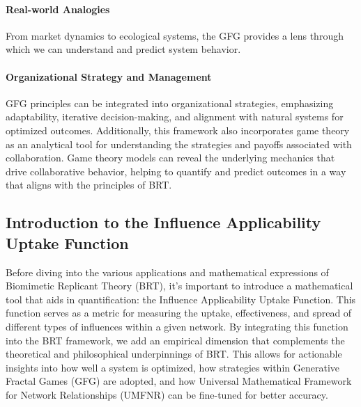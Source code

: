 \documentclass[sn-nature]{sn-jnl}%
\theoremstyle{thmstyleone}%
\theoremstyle{thmstyletwo}%
\theoremstyle{thmstylethree}%
\begin{document}
\paragraph{Real-world Analogies}
From market dynamics to ecological systems, the GFG provides a lens through which we can understand and predict system behavior.
\paragraph{Organizational Strategy and Management}
GFG principles can be integrated into organizational strategies, emphasizing adaptability, iterative decision-making, and alignment with natural systems for optimized outcomes\cite{ujwary-gil_organizational_2020}. Additionally, this framework also incorporates game theory as an analytical tool for understanding the strategies and payoffs associated with collaboration. Game theory models can reveal the underlying mechanics that drive collaborative behavior, helping to quantify and predict outcomes in a way that aligns with the principles of BRT.


\subsection{Introduction to the Influence Applicability Uptake Function}

Before diving into the various applications and mathematical expressions of Biomimetic Replicant Theory (BRT), it's important to introduce a mathematical tool that aids in quantification: the Influence Applicability Uptake Function. This function serves as a metric for measuring the uptake, effectiveness, and spread of different types of influences within a given network.
By integrating this function into the BRT framework, we add an empirical dimension that complements the theoretical and philosophical underpinnings of BRT. This allows for actionable insights into how well a system is optimized, how strategies within Generative Fractal Games (GFG) are adopted, and how Universal Mathematical Framework for Network Relationships (UMFNR) can be fine-tuned for better accuracy.
\end{document}
